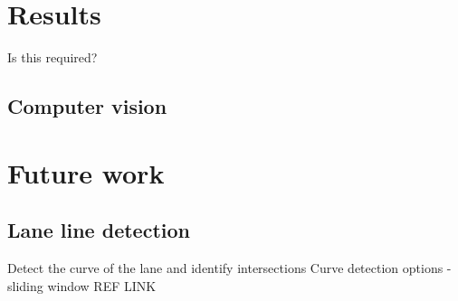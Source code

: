 \documentclass[]{aiaa-tc}%
\begin{document}
\section{Results}
Is this required?
\subsection{Computer vision}


\section{Future work}

\subsection{Lane line detection}

Detect the curve of the lane and identify intersections
Curve detection options - sliding window REF LINK %
\end{document}

